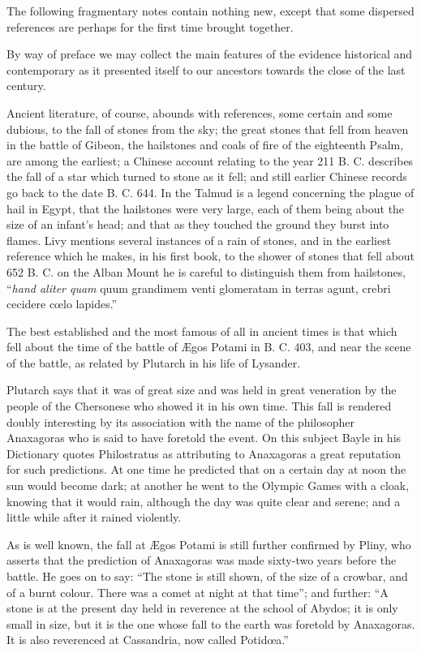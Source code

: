 \documentclass[a4paper, 12pt, oneside]{article}
\begin{document}
The following fragmentary notes contain nothing new, except that some dispersed references are perhaps for the first time brought together. 

By way of preface we may collect the main features of the evidence historical and contemporary as it presented itself to our ancestors towards the close of the last century. 

Ancient literature, of course, abounds with references, some certain and some dubious, to the fall of stones from the sky; the great stones that fell from heaven in the battle of Gibeon, the hailstones and coals of fire of the eighteenth Psalm, are among the earliest; a Chinese account relating to the year 211 B. C. describes the fall of a star which turned to stone as it fell; and still earlier Chinese records go back to the date B. C. 644. In the Talmud is a legend concerning the plague of hail in Egypt, that the hailstones were very large, each of them being about the size of an infant's head; and that as they touched the ground they burst into flames. Livy mentions several instances of a rain of stones, and in the earliest reference which he makes, in his first book, to the shower of stones that fell about 652 B. C. on the Alban Mount he is careful to distinguish them from hailstones, ``\emph{hand aliter quam} quum grandimem venti glomeratam in terras agunt, crebri cecidere cœlo lapides.'' 

The best established and the most famous of all in ancient times is that which fell about the time of the battle of Ægos Potami in B. C. 403, and near the scene of the battle, as related by Plutarch in his life of Lysander. 

Plutarch says that it was of great size and was held in great veneration by the people of the Chersonese who showed it in his own time. This fall is rendered doubly interesting by its association with the name of the philosopher Anaxagoras who is said to have foretold the event. On this subject Bayle in his Dictionary quotes Philostratus as attributing to Anaxagoras a great reputation for such predictions. At one time he predicted that on a certain day at noon the sun would become dark; at another he went to the Olympic Games with a cloak, knowing that it would rain, although the day was quite clear and serene; and a little while after it rained violently. 

As is well known, the fall at Ægos Potami is still further confirmed by Pliny, who asserts that the prediction of Anaxagoras was made sixty-two years before the battle. He goes on to say: ``The stone is still shown, of the size of a crowbar, and of a burnt colour. There was a comet at night at that time''; and further: ``A stone is at the present day held in reverence at the school of Abydos; it is only small in size, but it is the one whose fall to the earth was foretold by Anaxagoras. It is also reverenced at Cassandria, now called Potidœa.''
\end{document}
